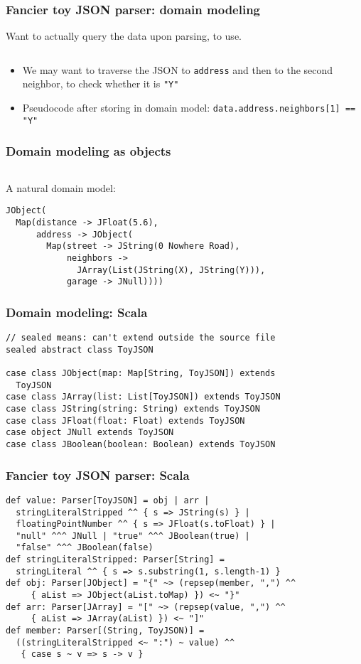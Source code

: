 \begin{frame}[fragile]
  \frametitle{Fancier toy JSON parser: domain modeling}

  Want to actually query the data upon parsing, to use.

  \inputminted{json}{javascript/example.json}
  
  \begin{itemize}
    \item We may want to traverse the JSON to \texttt{address} and then to the second neighbor, to check whether it is \texttt{"Y"}
    \item Pseudocode after storing in domain model: \texttt{data.address.neighbors[1] == "Y"}
  \end{itemize}
\end{frame}

\begin{frame}[fragile]
  \frametitle{Domain modeling as objects}

  \inputminted{json}{javascript/example.json}

  A natural domain model:
  \begin{verbatim}
JObject(
  Map(distance -> JFloat(5.6),
      address -> JObject(
        Map(street -> JString(0 Nowhere Road),
            neighbors ->
              JArray(List(JString(X), JString(Y))),
            garage -> JNull))))
  \end{verbatim}
\end{frame}

\begin{frame}[fragile]
  \frametitle{Domain modeling: Scala}

  \begin{verbatim}
// sealed means: can't extend outside the source file
sealed abstract class ToyJSON

case class JObject(map: Map[String, ToyJSON]) extends
  ToyJSON
case class JArray(list: List[ToyJSON]) extends ToyJSON
case class JString(string: String) extends ToyJSON
case class JFloat(float: Float) extends ToyJSON
case object JNull extends ToyJSON
case class JBoolean(boolean: Boolean) extends ToyJSON
  \end{verbatim}
\end{frame}

\begin{frame}[fragile]
  \frametitle{Fancier toy JSON parser: Scala}

  \begin{verbatim}
def value: Parser[ToyJSON] = obj | arr |
  stringLiteralStripped ^^ { s => JString(s) } |
  floatingPointNumber ^^ { s => JFloat(s.toFloat) } |
  "null" ^^^ JNull | "true" ^^^ JBoolean(true) |
  "false" ^^^ JBoolean(false)
def stringLiteralStripped: Parser[String] =
  stringLiteral ^^ { s => s.substring(1, s.length-1) }
def obj: Parser[JObject] = "{" ~> (repsep(member, ",") ^^
     { aList => JObject(aList.toMap) }) <~ "}"
def arr: Parser[JArray] = "[" ~> (repsep(value, ",") ^^
     { aList => JArray(aList) }) <~ "]"
def member: Parser[(String, ToyJSON)] =
  ((stringLiteralStripped <~ ":") ~ value) ^^
   { case s ~ v => s -> v }
  \end{verbatim}
\end{frame}

